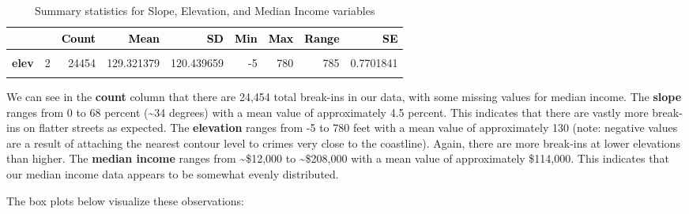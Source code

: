 \documentclass[
]{article}
\begin{document}
\begin{table}

\caption{\label{tab:unnamed-chunk-3}Summary statistics for Slope, Elevation, and Median Income variables}
\centering
\fontsize{15}{17}\selectfont
\begin{tabular}[t]{>{}l|r|r|r|r|r|r|r|r}
\hline
\textcolor{black}{\textbf{ }} & \textcolor{black}{\textbf{}} & \textcolor{black}{\textbf{Count}} & \textcolor{black}{\textbf{Mean}} & \textcolor{black}{\textbf{SD}} & \textcolor{black}{\textbf{Min}} & \textcolor{black}{\textbf{Max}} & \textcolor{black}{\textbf{Range}} & \textcolor{black}{\textbf{SE}}\\
\hline
\textbf{\cellcolor{gray!6}{slope}} & \cellcolor{gray!6}{1} & \cellcolor{gray!6}{24454} & \cellcolor{gray!6}{4.492966} & \cellcolor{gray!6}{4.793824} & \cellcolor{gray!6}{0} & \cellcolor{gray!6}{68} & \cellcolor{gray!6}{68} & \cellcolor{gray!6}{0.0306554}\\
\hline
\textbf{elev} & 2 & 24454 & 129.321379 & 120.439659 & -5 & 780 & 785 & 0.7701841\\
\hline
\textbf{\cellcolor{gray!6}{median\_income}} & \cellcolor{gray!6}{3} & \cellcolor{gray!6}{23764} & \cellcolor{gray!6}{114039.269567} & \cellcolor{gray!6}{47501.416992} & \cellcolor{gray!6}{12340} & \cellcolor{gray!6}{208425} & \cellcolor{gray!6}{196085} & \cellcolor{gray!6}{308.1390882}\\
\hline
\end{tabular}
\end{table}

We can see in the \textbf{count} column that there are 24,454 total
break-ins in our data, with some missing values for median income. The
\textbf{slope} ranges from 0 to 68 percent (\textasciitilde34 degrees)
with a mean value of approximately 4.5 percent. This indicates that
there are vastly more break-ins on flatter streets as expected. The
\textbf{elevation} ranges from -5 to 780 feet with a mean value of
approximately 130 (note: negative values are a result of attaching the
nearest contour level to crimes very close to the coastline). Again,
there are more break-ins at lower elevations than higher. The
\textbf{median income} ranges from \textasciitilde\$12,000 to
\textasciitilde\$208,000 with a mean value of approximately \$114,000.
This indicates that our median income data appears to be somewhat evenly
distributed.

The box plots below visualize these observations:
\end{document}
